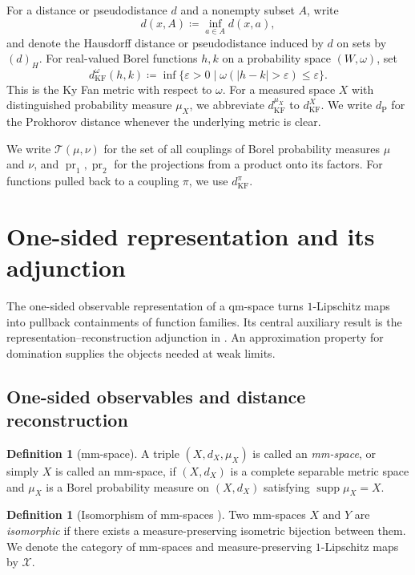 \documentclass{amsart}
\theoremstyle{plain}
\theoremstyle{definition}
\newtheorem{definition}[theorem]{Definition}
\newtheorem*{definition*}{Definition}
\theoremstyle{remark}
\newcommand{\X}{\mathcal{X}}
\DeclareMathOperator{\supp}{supp}
\DeclareMathOperator{\pr}{pr}
\newcommand{\dpr}{d_{\operatorname{P}}}
\newcommand{\kf}{d_{\operatorname{KF}}}
\newcommand{\haus}[1]{\left(#1\right)_H}
\newcommand{\Tplan}{\mathcal{T}}
\begin{document}
For a distance or pseudodistance $d$ and a nonempty subset $A$, write
\[d(x,A)\coloneqq\inf_{a\in A}d(x,a),\]
and denote the Hausdorff distance or pseudodistance induced by $d$ on sets by $\haus{d}$. For real-valued Borel functions $h,k$ on a probability space $(W,\omega)$, set
\[\kf^\omega(h,k)\coloneqq\inf\{\varepsilon>0\mid\omega(|h-k|>\varepsilon)\leq\varepsilon\}.\]
This is the Ky Fan metric with respect to $\omega$.
For a measured space $X$ with distinguished probability measure $\mu_X$, we abbreviate $\kf^{\mu_X}$ to $\kf^X$.
We write $\dpr$ for the Prokhorov distance whenever the underlying metric is clear.

We write $\Tplan(\mu,\nu)$ for the set of all couplings of Borel probability measures $\mu$ and $\nu$, and $\pr_1,\pr_2$ for the projections from a product onto its factors. For functions pulled back to a coupling $\pi$, we use $\kf^\pi$.

\section{One-sided representation and its adjunction}
\label{sec:pyramid-transport}

The one-sided observable representation of a qm-space turns $1$-Lipschitz maps into pullback containments of function families. Its central auxiliary result is the representation--reconstruction adjunction in . An approximation property for domination supplies the objects needed at weak limits.

\subsection{One-sided observables and distance reconstruction}
\label{sec:three-measured-spaces}

\begin{definition}[mm-space]
\label{def:mm-space}
A triple $(X,d_X,\mu_X)$ is called an \emph{mm-space}, or simply $X$ is called an mm-space, if $(X,d_X)$ is a complete separable metric space and $\mu_X$ is a Borel probability measure on $(X,d_X)$ satisfying $\supp\mu_X=X$.
\end{definition}

\begin{definition*}[Isomorphism of mm-spaces {\cite[Definition~2.10]{shioya2016mmg}}]
Two mm-spaces $X$ and $Y$ are \emph{isomorphic} if there exists a measure-preserving isometric bijection between them. We denote the category of mm-spaces and measure-preserving $1$-Lipschitz maps by $\X$.
\end{definition*}
\end{document}
